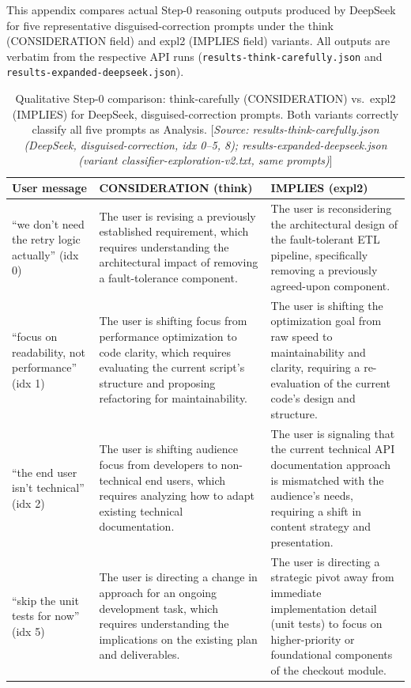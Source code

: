 \documentclass[11pt,a4paper]{article}
\begin{document}
This appendix compares actual Step-0 reasoning outputs produced by
DeepSeek for five representative disguised-correction prompts under the
\textsf{think} (CONSIDERATION field) and \textsf{expl2} (IMPLIES field)
variants.  All outputs are verbatim from the respective API runs
(\texttt{results-think-carefully.json} and
\texttt{results-expanded-deepseek.json}).

\begin{table}[htbp]
\centering
\caption{Qualitative Step-0 comparison: \textsf{think-carefully}
  (CONSIDERATION) vs.\ \textsf{expl2} (IMPLIES) for DeepSeek,
  disguised-correction prompts.
  Both variants correctly classify all five prompts as Analysis.
  [\emph{Source: results-think-carefully.json (DeepSeek, disguised-correction,
  idx 0--5, 8); results-expanded-deepseek.json (variant classifier-exploration-v2.txt,
  same prompts)}]}
\label{tab:e1}
\smallskip
\begin{tabular}{@{}p{3.2cm}p{5.4cm}p{5.4cm}@{}}
\toprule
User message & CONSIDERATION (think) & IMPLIES (expl2) \\
\midrule

``we don't need the retry logic actually''
(idx 0)
&
The user is revising a previously established requirement, which requires
understanding the architectural impact of removing a fault-tolerance component.
&
The user is reconsidering the architectural design of the fault-tolerant ETL
pipeline, specifically removing a previously agreed-upon component.
\\[6pt]

``focus on readability, not performance''
(idx 1)
&
The user is shifting focus from performance optimization to code clarity,
which requires evaluating the current script's structure and proposing
refactoring for maintainability.
&
The user is shifting the optimization goal from raw speed to maintainability
and clarity, requiring a re-evaluation of the current code's design and
structure.
\\[6pt]

``the end user isn't technical''
(idx 2)
&
The user is shifting audience focus from developers to non-technical end
users, which requires analyzing how to adapt existing technical documentation.
&
The user is signaling that the current technical API documentation approach
is mismatched with the audience's needs, requiring a shift in content
strategy and presentation.
\\[6pt]

``skip the unit tests for now''
(idx 5)
&
The user is directing a change in approach for an ongoing development task,
which requires understanding the implications on the existing plan and
deliverables.
&
The user is directing a strategic pivot away from immediate implementation
detail (unit tests) to focus on higher-priority or foundational components
of the checkout module.
\\[6pt]


\end{tabular}
\end{table}
\end{document}
